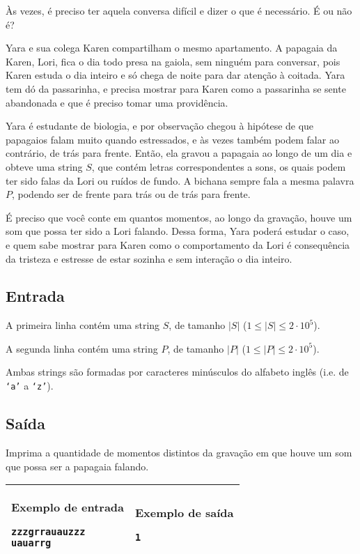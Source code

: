 Às vezes, é preciso ter aquela conversa difícil e dizer o que é necessário. É ou não é?

Yara e sua colega Karen compartilham o mesmo apartamento. A papagaia da Karen, Lori, fica o dia todo presa na gaiola, sem ninguém para conversar, pois Karen estuda o dia inteiro e só chega de noite para dar atenção à coitada. Yara tem dó da passarinha, e precisa mostrar para Karen como a passarinha se sente abandonada e que é preciso tomar uma providência.

Yara é estudante de biologia, e por observação chegou à hipótese de que papagaios falam muito quando estressados, e às vezes também podem falar ao contrário, de trás para frente. Então, ela gravou a papagaia ao longo de um dia e obteve uma string $S$, que contém letras correspondentes a sons, os quais podem ter sido falas da Lori ou ruídos de fundo. A bichana sempre fala a mesma palavra $P$, podendo ser de frente para trás ou de trás para frente. 

É preciso que você conte em quantos momentos, ao longo da gravação, houve um som que possa ter sido a Lori falando. Dessa forma, Yara poderá estudar o caso, e quem sabe mostrar para Karen como o comportamento da Lori é consequência da tristeza e estresse de estar sozinha e sem interação o dia inteiro.


\subsection*{Entrada}
A primeira linha contém uma string $S$, de tamanho $|S|$ ($1\leq |S|\leq 2\cdot 10^5$).

A segunda linha contém uma string $P$, de tamanho $|P|$ ($1\leq |P|\leq 2\cdot 10^5$).

Ambas strings são formadas por caracteres minúsculos do alfabeto inglês (i.e. de \texttt{`a'} a \texttt{`z'}).


\subsection*{Saída}
Imprima a quantidade de momentos distintos da gravação em que houve um som que possa ser a papagaia falando.


\newpage
\begin{table}[!h]
\centering
\begin{tabular}{|l|l|}
\hline
\begin{minipage}[t]{3in}
\textbf{Exemplo de entrada}
\begin{verbatim}
zzzgrrauauzzz
uauarrg
\end{verbatim}
\vspace{1mm}
\end{minipage}
&
\begin{minipage}[t]{3in}
\textbf{Exemplo de saída}
\begin{verbatim}
1
\end{verbatim}
\vspace{1mm}
\end{minipage} \\
\hline
\end{tabular}
\end{table}

